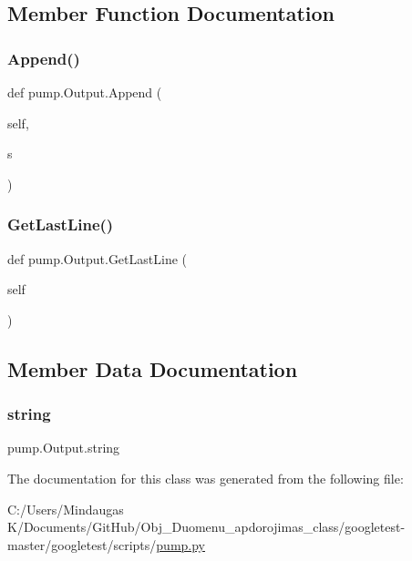 \subsection{Member Function Documentation}
\mbox{\label{classpump_1_1_output_a6f284bb3f80e03594bc28286c695f5a7}} 
\subsubsection{\texorpdfstring{Append()}{Append()}}
{\footnotesize\ttfamily def pump.\+Output.\+Append (\begin{DoxyParamCaption}\item[{}]{self,  }\item[{}]{s }\end{DoxyParamCaption})}

\mbox{\label{classpump_1_1_output_a6ece94d24be171bae2a2234c052b4c58}} 
\subsubsection{\texorpdfstring{GetLastLine()}{GetLastLine()}}
{\footnotesize\ttfamily def pump.\+Output.\+Get\+Last\+Line (\begin{DoxyParamCaption}\item[{}]{self }\end{DoxyParamCaption})}



\subsection{Member Data Documentation}
\mbox{\label{classpump_1_1_output_a8786848ab3d235189379c449a446f883}} 
\subsubsection{\texorpdfstring{string}{string}}
{\footnotesize\ttfamily pump.\+Output.\+string}



The documentation for this class was generated from the following file\+:\begin{DoxyCompactItemize}
\item 
C\+:/\+Users/\+Mindaugas K/\+Documents/\+Git\+Hub/\+Obj\+\_\+\+Duomenu\+\_\+apdorojimas\+\_\+class/googletest-\/master/googletest/scripts/\mbox{\hyperlink{googletest-master_2googletest_2scripts_2pump_8py}{pump.\+py}}\end{DoxyCompactItemize}
